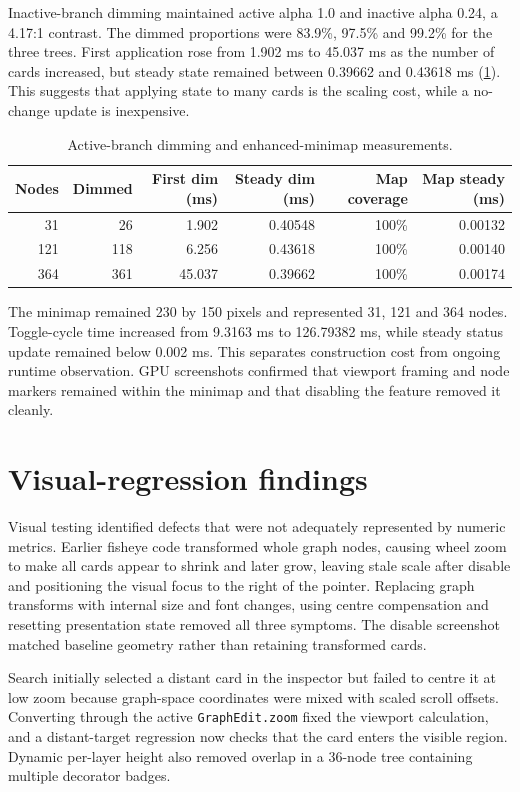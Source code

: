 Inactive-branch dimming maintained active alpha 1.0 and inactive alpha 0.24, a 4.17:1 contrast. The dimmed proportions were 83.9\%, 97.5\% and 99.2\% for the three trees. First application rose from 1.902 ms to 45.037 ms as the number of cards increased, but steady state remained between 0.39662 and 0.43618 ms (\cref{tab:runtimevisual}). This suggests that applying state to many cards is the scaling cost, while a no-change update is inexpensive.

\begin{table}[htbp]
\centering
\caption{Active-branch dimming and enhanced-minimap measurements.}
\label{tab:runtimevisual}
\small
\begin{tabular}{rrrrrr}
\toprule
Nodes & Dimmed & First dim (ms) & Steady dim (ms) & Map coverage & Map steady (ms) \\
\midrule
31 & 26 & 1.902 & 0.40548 & 100\% & 0.00132 \\
121 & 118 & 6.256 & 0.43618 & 100\% & 0.00140 \\
364 & 361 & 45.037 & 0.39662 & 100\% & 0.00174 \\
\bottomrule
\end{tabular}
\end{table}

The minimap remained 230 by 150 pixels and represented 31, 121 and 364 nodes. Toggle-cycle time increased from 9.3163 ms to 126.79382 ms, while steady status update remained below 0.002 ms. This separates construction cost from ongoing runtime observation. GPU screenshots confirmed that viewport framing and node markers remained within the minimap and that disabling the feature removed it cleanly.

\section{Visual-regression findings}

Visual testing identified defects that were not adequately represented by numeric metrics. Earlier fisheye code transformed whole graph nodes, causing wheel zoom to make all cards appear to shrink and later grow, leaving stale scale after disable and positioning the visual focus to the right of the pointer. Replacing graph transforms with internal size and font changes, using centre compensation and resetting presentation state removed all three symptoms. The disable screenshot matched baseline geometry rather than retaining transformed cards.

Search initially selected a distant card in the inspector but failed to centre it at low zoom because graph-space coordinates were mixed with scaled scroll offsets. Converting through the active \texttt{GraphEdit.zoom} fixed the viewport calculation, and a distant-target regression now checks that the card enters the visible region. Dynamic per-layer height also removed overlap in a 36-node tree containing multiple decorator badges.

